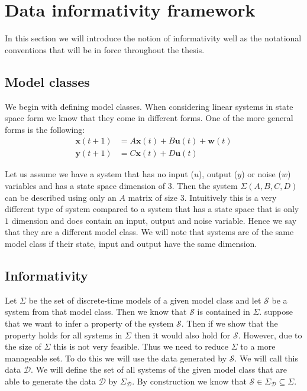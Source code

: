 \section{Data informativity framework}
In this section we will introduce the notion of informativity well as the notational conventions that will be in force throughout the thesis.

\subsection{Model classes}
We begin with defining model classes. When considering linear systems in state space form we know that they come in different forms. One of the more general forms is the following:
\begin{align}
	\mathbf{x}(t+1) &= A \mathbf{x}(t) + B \mathbf{u}(t) + \mathbf{w}(t)\\
	\mathbf{y}(t+1) &= C \mathbf{x}(t) + D \mathbf{u}(t)
\end{align}

Let us assume we have a system that has no input ($u$), output ($y$) or noise ($w$) variables and has a state space dimension of $3$. Then the system $\Sigma(A,B,C,D)$ can be described using only an $A$ matrix of size $3$. Intuitively this is a very different type of system compared to a system that has a state space that is only $1$ dimension and does contain an input, output and noise variable. Hence we say that they are a different model class. We will note that systems are of the same model class if their state, input and output have the same dimension.

\subsection{Informativity}
Let $\Sigma$ be the set of discrete-time models of a given model class and let $\mathcal{S}$ be a system from that model class. Then we know that $\mathcal{S}$ is contained in $\Sigma$. suppose that we want to infer a property of the system $\mathcal{S}$. Then if we show that the property holds for all systems in $\Sigma$ then it would also hold for $\mathcal{S}$. However, due to the size of $\Sigma$ this is not very feasible. Thus we need to reduce $\Sigma$ to a more manageable set. To do this we will use the data generated by $\mathcal{S}$. We will call this data $\mathcal{D}$. We will define the set of all systems of the given model class that are able to generate the data $\mathcal{D}$ by $\Sigma_\mathcal{D}$. By construction we know that $\mathcal{S} \in \Sigma_\mathcal{D} \subseteq \Sigma$.

